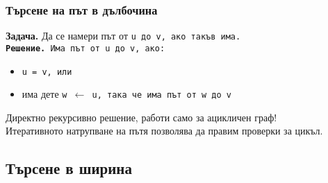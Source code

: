 \documentclass{beamer}
\begin{document}
\begin{frame}[t,fragile]
  \frametitle{Търсене на път в дълбочина}
  \textbf{Задача.} Да се намери път от \tt u до \tt v, ако такъв има.\\
  \pause\onslide<+->
  \textbf{Решение.} Има път от \tt u до \tt v, ако:
  \begin{itemize}
  \item \tt u = \tt v, или
  \item има дете \tt w $\leftarrow$ \tt u, така че има път от \tt w до \tt v
  \end{itemize}
  \onslide<+->
    \small
    \begin{overlayarea}{\textwidth}{10em}
\begin{semiverbatim}
\end{semiverbatim}
    \end{overlayarea}
    \onslide<+->
    \alert{Директно рекурсивно решение, работи само за ацикличен граф!}\\
    \onslide<+->
    Итеративното натрупване на пътя позволява да правим проверки за цикъл.
\end{frame}

\subsection{Търсене в ширина}
\end{document}

